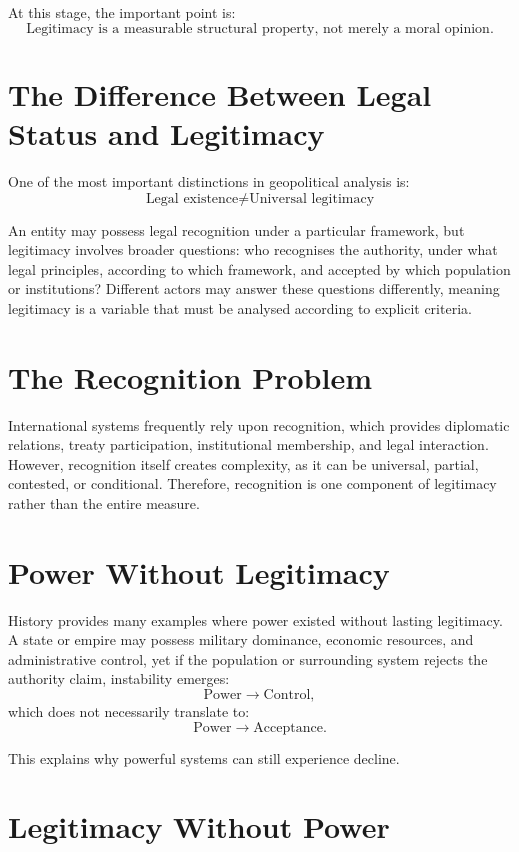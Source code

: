 \documentclass[11pt,openany]{book}
\theoremstyle{plain}
\theoremstyle{definition}
\begin{document}
At this stage, the important point is:
\[
\boxed{
\text{Legitimacy is a measurable structural property, not merely a moral opinion.}
}
\]

\section*{The Difference Between Legal Status and Legitimacy}

One of the most important distinctions in geopolitical analysis is:
\[
\boxed{
\text{Legal existence} \neq \text{Universal legitimacy}
}
\]

An entity may possess legal recognition under a particular framework, but legitimacy involves broader questions: who recognises the authority, under what legal principles, according to which framework, and accepted by which population or institutions? Different actors may answer these questions differently, meaning legitimacy is a variable that must be analysed according to explicit criteria.

\section*{The Recognition Problem}

International systems frequently rely upon recognition, which provides diplomatic relations, treaty participation, institutional membership, and legal interaction. However, recognition itself creates complexity, as it can be universal, partial, contested, or conditional. Therefore, recognition is one component of legitimacy rather than the entire measure.

\section*{Power Without Legitimacy}

History provides many examples where power existed without lasting legitimacy. A state or empire may possess military dominance, economic resources, and administrative control, yet if the population or surrounding system rejects the authority claim, instability emerges:
\[
\text{Power} \longrightarrow \text{Control},
\]
which does not necessarily translate to:
\[
\text{Power} \longrightarrow \text{Acceptance}.
\]

This explains why powerful systems can still experience decline.

\section*{Legitimacy Without Power}
\end{document}
